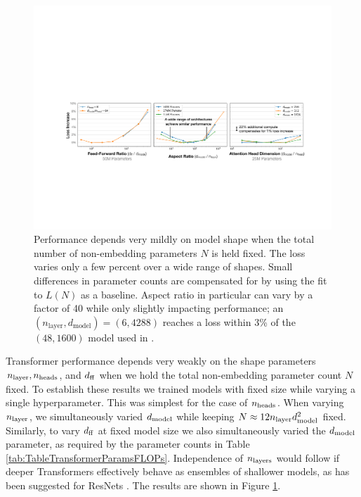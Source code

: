 \documentclass[english]{article}
\begin{document}
\begin{figure}
\noindent \centering{} 
\includegraphics[width=\textwidth]{HyperparameterTuning}
 \caption[Weak dependence of performance on hyperparameter tuning]{Performance depends very mildly on model shape when the total number of non-embedding parameters $N$ is held fixed.  The loss varies only a few percent over a wide range of shapes.  Small differences in parameter counts are compensated for by using the fit to $L(N)$ as a baseline.  Aspect ratio in particular can vary by a factor of 40 while only slightly impacting performance; an $(n_{\mathrm{layer}}, d_{\mathrm{model}}) = (6, 4288)$ reaches a loss within 3\% of the $(48, 1600)$ model used in \cite{radford2019language}.  \label{fig:HeadsLayersIndependence}}
\end{figure}

Transformer performance depends very weakly on the shape parameters $n_{\rm layer}, n_{\rm heads}$, and $d_{\rm ff}$ when we hold the total non-embedding parameter count $N$ fixed.  
To establish these results we  trained models with fixed size while varying a single hyperparameter. This was simplest for the case of $n_{\rm heads}$.  When varying $n_{\rm layer}$, we simultaneously varied $d_{{\rm model}}$ while keeping $N \approx 12 n_{\rm layer} d_{{\rm model}}^2$ fixed.  Similarly, to vary $d_{\rm ff}$ at fixed model size we also simultaneously varied the $d_{{\rm model}}$ parameter, as required by the parameter counts in Table \ref{tab:TableTransformerParamsFLOPs}.  Independence of $n_{\rm layers}$ would follow if deeper Transformers effectively behave as ensembles of shallower models, as has been suggested for ResNets \cite{ResNetsEnsemblesShallow}.  The results are shown in Figure \ref{fig:HeadsLayersIndependence}.
\end{document}
